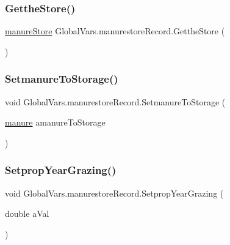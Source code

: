 \subsubsection{\texorpdfstring{GettheStore()}{GettheStore()}}
{\footnotesize\ttfamily \mbox{\hyperlink{classmanure_store}{manure\+Store}} Global\+Vars.\+manurestore\+Record.\+Getthe\+Store (\begin{DoxyParamCaption}{ }\end{DoxyParamCaption})\hspace{0.3cm}{\ttfamily [inline]}}

\mbox{\label{struct_global_vars_1_1manurestore_record_abc16bb40bedf65c707279636db4de2c1}} 
\subsubsection{\texorpdfstring{SetmanureToStorage()}{SetmanureToStorage()}}
{\footnotesize\ttfamily void Global\+Vars.\+manurestore\+Record.\+Setmanure\+To\+Storage (\begin{DoxyParamCaption}\item[{\mbox{\hyperlink{classmanure}{manure}}}]{amanure\+To\+Storage }\end{DoxyParamCaption})\hspace{0.3cm}{\ttfamily [inline]}}

\mbox{\label{struct_global_vars_1_1manurestore_record_a159a0073b4ebf619056dd88a4e2aa7b8}} 
\subsubsection{\texorpdfstring{SetpropYearGrazing()}{SetpropYearGrazing()}}
{\footnotesize\ttfamily void Global\+Vars.\+manurestore\+Record.\+Setprop\+Year\+Grazing (\begin{DoxyParamCaption}\item[{double}]{a\+Val }\end{DoxyParamCaption})\hspace{0.3cm}{\ttfamily [inline]}}


